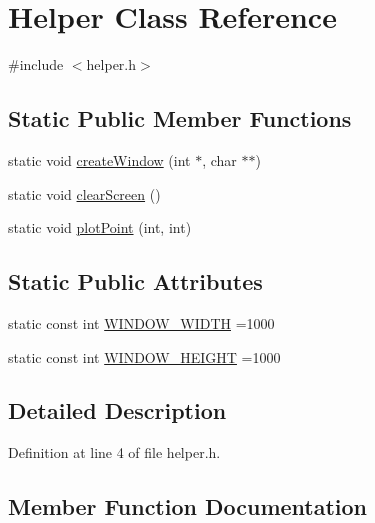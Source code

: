 \hypertarget{class_helper}{}\section{Helper Class Reference}
\label{class_helper}


{\ttfamily \#include $<$helper.\+h$>$}

\subsection*{Static Public Member Functions}
\begin{DoxyCompactItemize}
\item 
static void \mbox{\hyperlink{class_helper_a0c737a761fc0e355cfbab843904b805b}{create\+Window}} (int $\ast$, char $\ast$$\ast$)
\item 
static void \mbox{\hyperlink{class_helper_ae62e52c288fa71ecfeb463ba83a3e6a4}{clear\+Screen}} ()
\item 
static void \mbox{\hyperlink{class_helper_adb93a220e5cadac68b1ef3f3ca36ecfe}{plot\+Point}} (int, int)
\end{DoxyCompactItemize}
\subsection*{Static Public Attributes}
\begin{DoxyCompactItemize}
\item 
static const int \mbox{\hyperlink{class_helper_ad4164c542e99e3ef2ccdd49866fc35b8}{W\+I\+N\+D\+O\+W\+\_\+\+W\+I\+D\+TH}} =1000
\item 
static const int \mbox{\hyperlink{class_helper_a92080f2e118c556e3b9629698c5ca896}{W\+I\+N\+D\+O\+W\+\_\+\+H\+E\+I\+G\+HT}} =1000
\end{DoxyCompactItemize}


\subsection{Detailed Description}


Definition at line 4 of file helper.\+h.



\subsection{Member Function Documentation}
\mbox{\label{class_helper_ae62e52c288fa71ecfeb463ba83a3e6a4}} 
